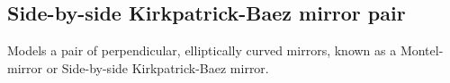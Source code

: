 \subsection*{Side-by-side Kirkpatrick-Baez mirror pair}

Models a pair of perpendicular, elliptically curved mirrors, known as a Montel-mirror or Side-by-side Kirkpatrick-Baez mirror.
